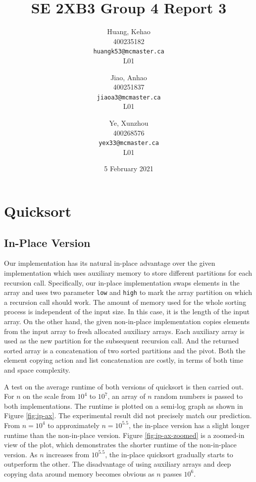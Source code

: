 \documentclass[titlepage, 12pt]{article}
\title{SE 2XB3 Group 4 Report 3}
\author{
  Huang, Kehao \\
  400235182 \\
  \texttt{huangk53@mcmaster.ca} \\
  L01
  \and
  Jiao, Anhao \\
  400251837 \\
  \texttt{jiaoa3@mcmaster.ca} \\
  L01
  \and
  Ye, Xunzhou \\
  400268576 \\
  \texttt{yex33@mcmaster.ca} \\
  L01
}
\date{5 February 2021}
\begin{document}
\maketitle{}

\newpage{}

\section{Quicksort}

\subsection{In-Place Version}
\label{sec:in-place}

Our implementation has its natural in-place advantage over the given
implementation which uses auxiliary memory to store different partitions for
each recursion call. Specifically, our in-place implementation swaps elements in
the array and uses two parameter \texttt{low} and \texttt{high} to mark the
array partition on which a recursion call should work. The amount of memory used
for the whole sorting process is independent of the input size. In this case, it
is the length of the input array. On the other hand, the given non-in-place
implementation copies elements from the input array to fresh allocated auxiliary
arrays. Each auxiliary array is used as the new partition for the subsequent
recursion call. And the returned sorted array is a concatenation of two sorted
partitions and the pivot. Both the element copying action and list concatenation
are costly, in terms of both time and space complexity.

A test on the average runtime of both versions of quicksort is then carried out.
For \( n \) on the scale from \( 10^4 \) to \( 10^7 \), an array of \( n \)
random numbers is passed to both implementations. The runtime is plotted on a
semi-log graph as shown in Figure \ref{fig:ip-ax}. The experimental result did
not precisely match our prediction. From \( n = 10^4 \) to approximately \( n =
10^{5.5} \), the in-place version has a slight longer runtime than the
non-in-place version. Figure \ref{fig:ip-ax-zoomed} is a zoomed-in view of the
plot, which demonstrates the shorter runtime of the non-in-place version. As \(
n \) increases from \( 10^{5.5} \), the in-place quicksort gradually starts to
outperform the other. The disadvantage of using auxiliary arrays and deep
copying data around memory becomes obvious as \( n \) passes \( 10^6 \).
\end{document}
